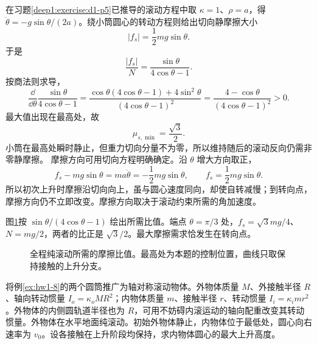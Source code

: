 \begin{solution}
在习题\ref{deep1:exercise:d1-p5}已推导的滚动方程中取 $\kappa=1$、$\rho=a$，得 $\ddot\theta=-g\sin\theta/(2a)$。绕小筒圆心的转动方程则给出切向静摩擦大小
\[
|f_s|=\frac12mg\sin\theta.
\]
于是
\[
\frac{|f_s|}{N}=\frac{\sin\theta}{4\cos\theta-1}.
\]
按商法则求导，
\[
\frac{\dd}{\dd\theta}\frac{\sin\theta}{4\cos\theta-1}
=\frac{\cos\theta(4\cos\theta-1)+4\sin^2\theta}{(4\cos\theta-1)^2}
=\frac{4-\cos\theta}{(4\cos\theta-1)^2}>0.
\]
最大值出现在最高处，故
\[
\boxed{\mu_{s,\min}=\frac{\sqrt3}{2}}.
\]
小筒在最高处瞬时静止，但重力切向分量不为零，所以维持随后的滚动反向仍需非零静摩擦。
摩擦方向可用切向方程明确确定。沿 $\theta$ 增大方向取正，
\[
f_s-mg\sin\theta=ma\ddot\theta=-\frac12mg\sin\theta,
\qquad f_s=\frac12mg\sin\theta.
\]
所以初次上升时摩擦沿切向向上，虽与圆心速度同向，却使自转减慢；到转向点，摩擦方向仍不立即改变。摩擦方向取决于滚动约束所需的角加速度。

图\ref{deep1:fig:d1-p11-friction}按 $\sin\theta/(4\cos\theta-1)$ 绘出所需比值。端点 $\theta=\pi/3$ 处，$f_s=\sqrt3mg/4$、$N=mg/2$，两者的比正是 $\sqrt3/2$。最大摩擦需求恰发生在转向点。
\begin{figure}[H]\centering
{}
\caption{全程纯滚动所需的摩擦比值。最高处为本题的控制位置，曲线只取保持接触的上升分支。}\label{deep1:fig:d1-p11-friction}
\end{figure}

\end{solution}


\begin{exercise}[任意转动惯量的内滚系统（选做）]\label{deep1:problem-exercise-12}\label{deep1:exercise:d1-p12}
将例\ref{ex:hw1-8}的两个圆筒推广为轴对称滚动物体。外物体质量 $M$、外接触半径 $R$、轴向转动惯量 $I_o=\kappa_oMR^2$；内物体质量 $m$、接触半径 $r$、转动惯量 $I_i=\kappa_imr^2$。外物体的内侧圆轨道半径也为 $R$，可用不妨碍内滚运动的轴向配重改变其转动惯量。外物体在水平地面纯滚动。初始外物体静止，内物体位于最低处，圆心向右速率为 $v_0$。设各接触在上升阶段均保持，求内物体圆心的最大上升高度。
\end{exercise}

